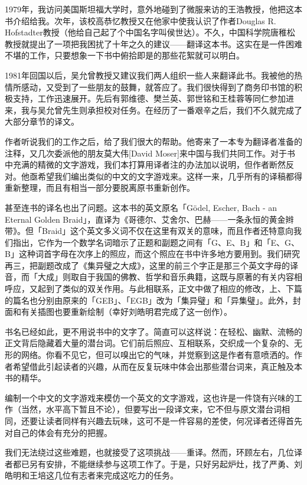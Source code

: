 \documentclass[
  12pt,
  twoside,
  openright,
  oldfontcommands,
]{memoir}
\begin{document}
1979年，我访问美国斯坦福大学时，意外地碰到了微服来访的王浩教授，他把这本书介绍给我。次年，该校高恭忆教授又在他家中使我认识了作者Douglas
R.
Hofstadter教授（他给自己起了个中国名字叫侯世达）。不久，中国科学院唐稚松教授就提出了一项把我困扰了十年之久的建议------翻译这本书。这实在是一件困难不堪的工作，只要想象一下书中俯拾即是的那些花絮就可以明白。

1981年回国以后，吴允曾教授又建议我们两人组织一些人来翻译此书。我被他的热情所感动，又受到了一些朋友的鼓舞，就答应了。我们很快得到了商务印书馆的积极支持，工作迅速展开。先后有郭维德、樊兰英、郭世铭和王桂蓉等同仁参加进来，我与吴允曾先生则承担校对任务。在经历了一番艰辛之后，我们不久就完成了大部分章节的译文。

作者听说我们的工作之后，给了我们很大的帮助。他寄来了一本专为翻译者准备的注释，又几次委派他的朋友莫大伟{[}David
Moser{]}来中国与我们共同工作。对于书中充满的精微的文字游戏，我们本打算用译者注的办法加以说明，但作者断然反对。他亟希望我们编出类似的中文的文字游戏来。这样一来，几乎所有的译稿都得重新整理，而且有相当一部分要脱离原书重新创作。

甚至连书的译名也出了问题。这本书的英文原名「Gödel, Escher, Bach - an
Eternal Golden
Braid」，直译为《哥德尔、艾舍尔、巴赫------一条永恒的黄金辫带》。但「Braid」这个英文多义词不仅在这里有双关的意味，而且作者还特意向我们指出，它作为一个数学名词暗示了正题和副题之间有「G、E、B」和「E、G、B」这种词首字母在次序上的照应，而这个照应在书中许多地方要用到。我们研究再三，把副题改成了《集异璧之大成》，这里的前三个字正是那三个英文字母的译音，而「大成」则取自于我国的佛教、哲学和音乐典籍，这既与原著的有关内容相呼应，又起到了类似的双关作用。与此相联系，正文中做了相应的修改，上、下篇的篇名也分别由原来的「GEB」、「EGB」改为「集异璧」和「异集璧」。此外，封面和有关插图也要重新绘制（幸好刘皓明君完成了这一创作）。

书名已经如此，更不用说书中的文字了。简直可以这样说：在轻松、幽默、流畅的正文背后隐藏着大量的潜台词。它们前后照应、互相联系，交织成一个复杂的、无形的网络。你看不见它，但可以嗅出它的气味，并觉察到这是作者有意喷洒的。作者希望借此引起读者的兴趣，从而在反复玩味中体会出那些潜台词来，真正触及本书的精华。

编制一个中文的文字游戏来模仿一个英文的文字游戏，这也许是一件饶有兴味的工作（当然，水平高下暂且不论），但要写出一段译文来，它不但与原文潜台词相同，还要让读者同样有兴趣去玩味，这可不是一件容易的差使，何况译者还得首先对自己的体会有充分的把握。

我们无法绕过这些难题，也就接受了这项挑战------重译。然而，环顾左右，几位译者都已另有安排，不能继续参与这项工作了。于是，只好另起炉灶，找了严勇、刘皓明和王培这几位有志者来完成这吃力的任务。
\end{document}
